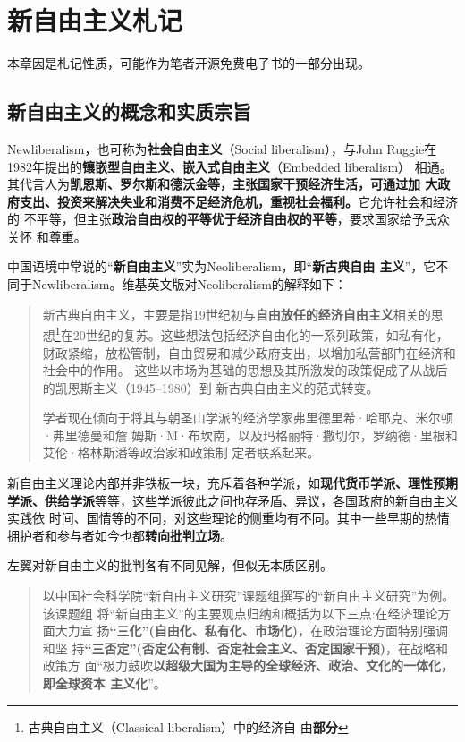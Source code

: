 \chapter{新自由主义札记}
\label{chap:neoliber}

本章因是札记性质，可能作为笔者开源免费电子书的一部分出现。

\section{新自由主义的概念和实质宗旨}

Newliberalism，也可称为\textbf{社会自由主义}（Social liberalism），与John
Ruggie在1982年提出的\textbf{镶嵌型自由主义、嵌入式自由主义}（Embedded liberalism）
相通。其代言人为\textbf{凯恩斯、罗尔斯和德沃金等，主张国家干预经济生活，可通过加
  大政府支出、投资来解决失业和消费不足经济危机，重视社会福利。}它允许社会和经济的
不平等，但主张\textbf{政治自由权的平等优于经济自由权的平等}，要求国家给予民众关怀
和尊重。\cite{newneo}

中国语境中常说的“\textbf{新自由主义}”实为Neoliberalism，即“\textbf{新古典自由
  主义}”，它不同于Newliberalism。维基英文版对Neoliberalism的解释如下：
\begin{quotation}
  新古典自由主义，主要是指19世纪初与\textbf{自由放任的经济自由主义}相关的思
  想\footnote{古典自由主义（Classical liberalism）中的经济自
    由\textbf{部分}}在20世纪的复苏。这些想法包括经济自由化的一系列政策，如私有化，
  财政紧缩，放松管制，自由贸易和减少政府支出，以增加私营部门在经济和社会中的作用。
  这些以市场为基础的思想及其所激发的政策促成了从战后的凯恩斯主义（1945--1980）到
  新古典自由主义的范式转变。

  学者现在倾向于将其与朝圣山学派的经济学家弗里德里希·哈耶克、米尔顿·弗里德曼和詹
  姆斯·M·布坎南，以及玛格丽特·撒切尔，罗纳德·里根和艾伦·格林斯潘等政治家和政策制
  定者联系起来。
\end{quotation}

新自由主义理论内部并非铁板一块，充斥着各种学派，如\textbf{现代货币学派、理性预期
  学派、供给学派}等等，这些学派彼此之间也存矛盾、异议，各国政府的新自由主义实践依
时间、国情等的不同，对这些理论的侧重均有不同。\cite{neoxuepai}其中一些早期的热情
拥护者和参与者如今也都\textbf{转向批判立场}。

左翼对新自由主义的批判各有不同见解，但似无本质区别。
\begin{quotation}
  以中国社会科学院“新自由主义研究”课题组撰写的“新自由主义研究”为例。该课题组
  将“新自由主义”的主要观点归纳和概括为以下三点:在经济理论方面大力宣
  扬\textbf{“三化”(自由化、私有化、市场化)}，在政治理论方面特别强调和坚
  持\textbf{“三否定”(否定公有制、否定社会主义、否定国家干预)}，在战略和政策方
  面“极力鼓吹\textbf{以超级大国为主导的全球经济、政治、文化的一体化，即全球资本
    主义化}”。\cite{newneo}
\end{quotation}

